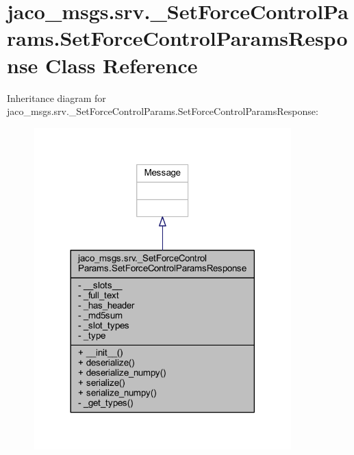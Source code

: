 \hypertarget{classjaco__msgs_1_1srv_1_1__SetForceControlParams_1_1SetForceControlParamsResponse}{}\section{jaco\+\_\+msgs.\+srv.\+\_\+\+Set\+Force\+Control\+Params.\+Set\+Force\+Control\+Params\+Response Class Reference}
\label{classjaco__msgs_1_1srv_1_1__SetForceControlParams_1_1SetForceControlParamsResponse}


Inheritance diagram for jaco\+\_\+msgs.\+srv.\+\_\+\+Set\+Force\+Control\+Params.\+Set\+Force\+Control\+Params\+Response\+:
\nopagebreak
\begin{figure}[H]
\begin{center}
\leavevmode
\includegraphics[width=281pt]{de/db8/classjaco__msgs_1_1srv_1_1__SetForceControlParams_1_1SetForceControlParamsResponse__inherit__graph}
\end{center}
\end{figure}



